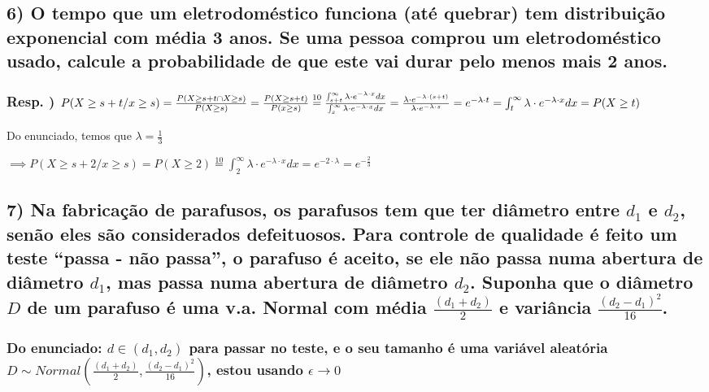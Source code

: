 \documentclass[portuguese]{article}
\begin{document}
\textbf{\textcompwordmark{}}


\subsection*{\textmd{6) O tempo que um eletrodoméstico funciona (até quebrar)
tem distribuição exponencial com média 3 anos. Se uma pessoa comprou
um eletrodoméstico usado, calcule a probabilidade de que este vai
durar pelo menos mais 2 anos.}}


\subsubsection*{\textmd{Resp. ) $P(X\geq s+t/x\geq s)=\frac{P(X\geq s+t\cap X\geq s)}{P(X\geq s)}=\frac{P(X\geq s+t)}{P(x\geq s)}\protect\overset{10}{=}\frac{\int_{s+t}^{\infty}\lambda\cdot e^{-\lambda\cdot x}dx}{\int_{s}^{\infty}\lambda\cdot e^{-\lambda\cdot x}dx}=\frac{\lambda\cdot e^{-\lambda\cdot\left(s+t\right)}}{\lambda\cdot e^{-\lambda\cdot s}}=e^{-\lambda\cdot t}=\int_{t}^{\infty}\lambda\cdot e^{-\lambda\cdot x}dx=P(X\geq t)$}}

Do enunciado, temos que $\lambda=\frac{1}{3}$

$\implies P(X\geq s+2/x\geq s)=P(X\geq2)\overset{10}{=}\int_{2}^{\infty}\lambda\cdot e^{-\lambda\cdot x}dx=e^{-2\cdot\lambda}=e^{-\frac{2}{3}}$

\textbf{\textcompwordmark{}}


\subsection*{\textmd{7) Na fabricação de parafusos, os parafusos tem que ter diâmetro
entre $d_{1}$ e $d_{2}$, senão eles são considerados defeituosos.
Para controle de qualidade é feito um teste ``passa - não passa'',
o parafuso é aceito, se ele não passa numa abertura de diâmetro $d_{1}$,
mas passa numa abertura de diâmetro $d_{2}$. Suponha que o diâmetro
$D$ de um parafuso é uma v.a. Normal com média $\frac{\left(d_{1}+d_{2}\right)}{2}$
e variância $\frac{\left(d_{2}-d_{1}\right)^{2}}{16}$.}}


\subsubsection*{\textmd{Do enunciado: $d\in\left(d_{1},d_{2}\right)$ para passar
no teste, e o seu tamanho é uma variável aleatória $D\sim Normal(\frac{\left(d_{1}+d_{2}\right)}{2},\frac{\left(d_{2}-d_{1}\right)^{2}}{16})$,
estou usando $\epsilon\rightarrow0$}}
\end{document}
